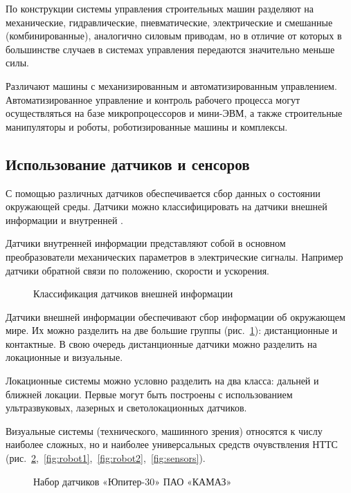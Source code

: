 По конструкции системы управления строительных машин разделяют на механические, гидравлические, пневматические, электрические и смешанные (комбинированные), аналогично силовым приводам, но в отличие от которых в большинстве случаев в системах управления передаются значительно меньше силы.

Различают машины с механизированным и автоматизированным управлением. Автоматизированное управление и контроль рабочего процесса могут осуществляться на базе микропроцессоров и мини-ЭВМ, а также строительные манипуляторы и роботы, роботизированные машины и комплексы.

\subsection{Использование датчиков и сенсоров}\label{subsec:ch1/sec2/sub2}

С помощью различных датчиков обеспечивается сбор данных о состоянии окружающей среды. Датчики можно классифицировать на датчики внешней информации и внутренней \cite[с.~131]{Vlasov}. 

Датчики внутренней информации представляют собой в основном преобразователи механических параметров в электрические сигналы. Например датчики обратной связи по положению, скорости и ускорения.

\begin{figure}[ht]
    \caption{Классификация датчиков внешней информации}\label{fig:datchiki}
\end{figure}

Датчики внешней информации обеспечивают сбор информации об окружающем мире. Их можно разделить на две большие группы (рис.~\cref{fig:datchiki}): дистанционные и контактные. В свою очередь дистанционные датчики можно разделить на локационные и визуальные.

Локационные системы можно условно разделить на два класса: дальней и ближней локации. Первые могут быть построены с использованием ультразвуковых, лазерных и светолокационных датчиков.

Визуальные системы (технического, машинного зрения) относятся к числу наиболее сложных, но и наиболее универсальных средств очувствления НТТС 
(рис.~\cref{fig:kamaz},~\cref{fig:robot1},~\cref{fig:robot2},~\cref{fig:sensors}).

\begin{figure}[ht]
    \caption{Набор датчиков «Юпитер-30» ПАО «КАМАЗ»}\label{fig:kamaz}
\end{figure}

